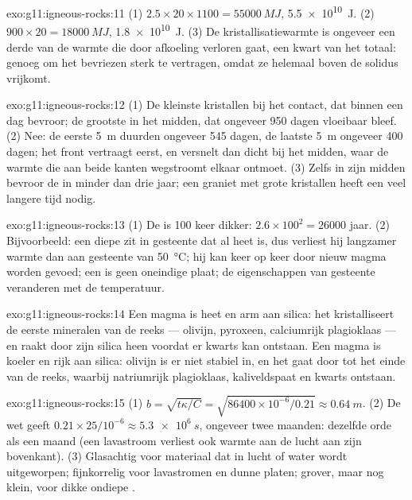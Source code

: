 \begin{solution}{exo:g11:igneous-rocks:11}
(1) $2.5 \times 20 \times 1100 = \qty{55000}{MJ}$, \qty{5.5e10}{J}.
(2) $900 \times 20 = \qty{18000}{MJ}$, \qty{1.8e10}{J}. (3) De
kristallisatiewarmte is ongeveer een derde van de warmte die door afkoeling verloren gaat, een kwart van
het totaal: genoeg om het bevriezen sterk te vertragen, omdat ze helemaal
boven de solidus vrijkomt.
\end{solution}

\begin{solution}{exo:g11:igneous-rocks:12}
(1) De kleinste kristallen bij het contact, dat binnen een dag bevroor; de
grootste in het midden, dat ongeveer 950 dagen vloeibaar bleef. (2) Nee: de
eerste \qty{5}{m} duurden ongeveer 545 dagen, de laatste \qty{5}{m} ongeveer 400 dagen; het
front vertraagt eerst, en versnelt dan dicht bij het midden, waar de warmte die
aan beide kanten wegstroomt elkaar ontmoet. (3) Zelfs in zijn midden bevroor de  in
minder dan drie jaar; een graniet met grote kristallen heeft een veel langere tijd nodig.
\end{solution}

\begin{solution}{exo:g11:igneous-rocks:13}
(1) De  is 100 keer dikker: $2.6 \times 100^2 = \num{26000}$
jaar. (2) Bijvoorbeeld: een diepe  zit in gesteente dat al heet is, dus
verliest hij langzamer warmte dan aan gesteente van \qty{50}{\degreeCelsius}; hij kan
keer op keer door nieuw magma worden gevoed; een  is geen oneindige plaat;
de eigenschappen van gesteente veranderen met de temperatuur.
\end{solution}

\begin{solution}{exo:g11:igneous-rocks:14}
Een  magma is heet en arm aan silica: het kristalliseert de eerste mineralen
van de reeks --- olivijn, pyroxeen, calciumrijk plagioklaas --- en raakt door zijn
silica heen voordat er kwarts kan ontstaan. Een  magma is koeler en rijk aan
silica: olivijn is er niet stabiel in, en het gaat door tot het einde van de
reeks, waarbij natriumrijk plagioklaas, kaliveldspaat en kwarts ontstaan.
\end{solution}

\begin{solution}{exo:g11:igneous-rocks:15}
(1) $b = \sqrt{t\kappa/C} = \sqrt{86400 \times 10^{-6}/0.21} \approx
\qty{0.64}{m}$. (2) De wet geeft $0.21 \times 25/10^{-6} \approx
\qty{5.3e6}{s}$, ongeveer twee maanden: dezelfde orde als een maand (een lavastroom
verliest ook warmte aan de lucht aan zijn bovenkant). (3) Glasachtig voor materiaal dat in
lucht of water wordt uitgeworpen; fijnkorrelig voor lavastromen en dunne platen; grover, maar nog
klein, voor dikke ondiepe .
\end{solution}

